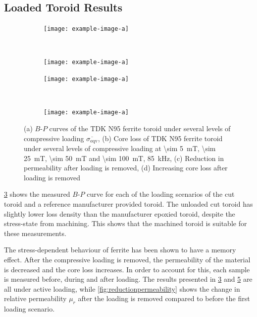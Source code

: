 \documentclass[conference]{IEEEtran}
\begin{document}
\subsection{Loaded Toroid Results}
\begin{figure}[t]
  \centering
  \begin{subfigure}{\columnwidth}
    \centering
    \texttt{[image: example-image-a]}
    \caption{}
    \label{fig:BPcurves}
  \end{subfigure}~
  \begin{subfigure}{\columnwidth}
    \centering
    \texttt{[image: example-image-a]}
    \caption{}
    \label{fig:corelossstress}
  \end{subfigure}

  \begin{subfigure}{\columnwidth}
    \centering
    \texttt{[image: example-image-a]}
    \caption{}
    \label{fig:BPcurves}
  \end{subfigure}~
  \begin{subfigure}{\columnwidth}
    \centering
    \texttt{[image: example-image-a]}
    \caption{}
    \label{fig:corelossstress}
  \end{subfigure}
  \caption{(a) $B$-$P$ curves of the TDK N95 ferrite toroid under several levels of compressive loading $\overline{\sigma_\text{eqv}}$, (b) Core loss of TDK N95 ferrite toroid under several levels of compressive loading at \SI{\sim 5}{\milli\tesla}, \SI{\sim 25}{\milli\tesla}, \SI{\sim 50}{\milli\tesla} and \SI{\sim 100}{\milli\tesla}, \SI{85}{\kilo\hertz}, (c) Reduction in permeability after loading is removed, (d) Increasing core loss after loading is removed}
\end{figure}

\cref{fig:BPcurves} shows the measured $B$-$P$ curve for each of the loading scenarios of the cut toroid and a reference manufacturer provided toroid. 
The unloaded cut toroid has slightly lower loss density than the manufacturer epoxied toroid, despite the stress-state from machining. 
This shows that the machined toroid is suitable for these measurements. 

The stress-dependent behaviour of ferrite has been shown to have a memory effect. 
After the compressive loading is removed, the permeability of the material is decreased and the core loss increases. 
In order to account for this, each sample is measured before, during and after loading. 
The results presented in \cref{fig:BPcurves} and \cref{fig:corelossstress} are all under active loading, while \cref{fig:reductionpermeability} shows the change in relative permeability $\mu_r$ after the loading is removed compared to before the first loading scenario. 
\end{document}
